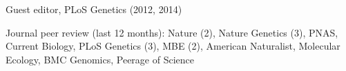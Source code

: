 \documentclass[letterpaper]{article}
\newcommand{\ignore}[1]{}
\renewenvironment{itemize}{
  \begin{list}{}{
    \setlength{\leftmargin}{1.5em}
  }
}{
  \end{list}
}
\begin{document}
\begin{itemize}
\item Guest editor, PLoS Genetics (2012, 2014)
\item Journal peer review (last 12 months): \ignore{8/13,10/13} Nature (2), \ignore {1/14, 3/14} Nature Genetics (3), \ignore{6/13,7/13,8/13,8/13} PNAS, \ignore{8/13} Current Biology, \ignore{3/13,4/14,4/14,8/14} PLoS Genetics (3), \ignore{7/14,7/14} MBE (2), \ignore {3/14} American Naturalist, \ignore{1/14} Molecular Ecology, \ignore{1/14} BMC Genomics, \ignore{9/13} Peerage of Science

\end{itemize}

\end{document}
